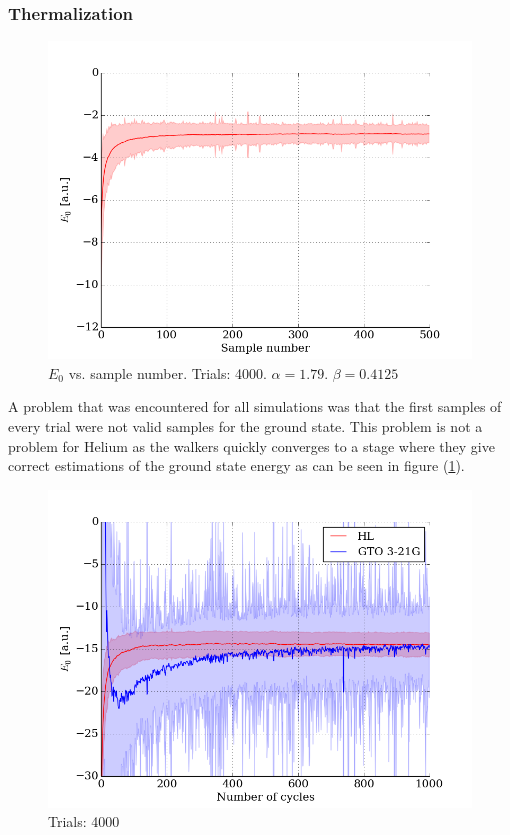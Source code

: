 \documentclass[twocolumns, a4paper,11pt,fleqn]{extarticle}
\begin{document}
\subsubsection{Thermalization}
\begin{figure}[H]
	\includegraphics[width=\columnwidth]{../res/plot/helium_04/helium_04_pretty.png}
	\caption[caption]{$E_0$ vs. sample number. 
	 	Trials: 4000. $\alpha = 1.79$. 
	$\beta = 0.4125$}
	\label{fig:helium_04}
\end{figure}
A problem that was encountered 
for all simulations was that the first samples of every 
trial were not valid samples for the ground state. This problem is not a problem for
Helium as the walkers quickly converges to a stage where they give correct
estimations of the ground state energy
as can be seen in figure (\ref{fig:helium_04}). 

\begin{figure}[H]
	\includegraphics[width=\columnwidth]{../res/plot/beryllium_04/beryllium_04_pretty.png}
	\caption{Trials: 4000}
	\label{fig:beryllium_04}
\end{figure}
\end{document}
